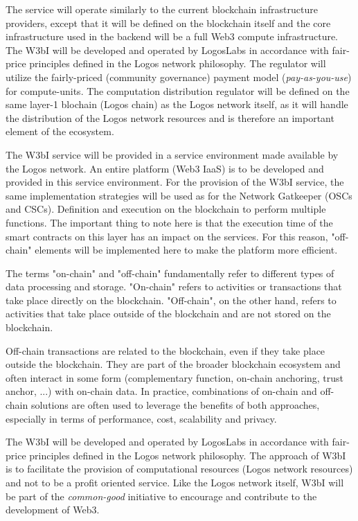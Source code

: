 \documentclass[]{article}
\begin{document}
The service will operate similarly to the current blockchain infrastructure providers, except that it will be defined on the blockchain itself and the core infrastructure used in the backend will be a full Web3 compute infrastructure.
The W3bI will be developed and operated by LogosLabs in accordance with fair-price principles defined in the Logos network philosophy.
The regulator will utilize the fairly-priced (community governance) payment model (\textit{pay-as-you-use}) \cite{WikipediaDoc-payu} for compute-units.
The computation distribution regulator will be defined on the same layer-1 blochain (Logos chain) as the Logos network itself, as it will handle the distribution of the Logos network resources and is therefore an important element of the ecosystem. 

The W3bI service will be provided in a service environment made available by the Logos network.
An entire platform (Web3 IaaS) is to be developed and provided in this service environment.
For the provision of the W3bI service, the same implementation strategies will be used as for the Network Gatkeeper (OSCs and CSCs). 
Definition and execution on the blockchain to perform multiple functions.
The important thing to note here is that the execution time of the smart contracts on this layer has an impact on the services. 
For this reason, "off-chain" elements will be implemented here to make the platform more efficient. 

The terms "on-chain" and "off-chain" fundamentally refer to different types of data processing and storage.
"On-chain" refers to activities or transactions that take place directly on the blockchain.
"Off-chain", on the other hand, refers to activities that take place outside of the blockchain and are not stored on the blockchain.

Off-chain transactions are related to the blockchain, even if they take place outside the blockchain. 
They are part of the broader blockchain ecosystem and often interact in some form (complementary function, on-chain anchoring, trust anchor, ...) with on-chain data.
In practice, combinations of on-chain and off-chain solutions are often used to leverage the benefits of both approaches, especially in terms of performance, cost, scalability and privacy.

The W3bI will be developed and operated by LogosLabs in accordance with fair-price principles defined in the Logos network philosophy.
The approach of W3bI is to facilitate the provision of computational resources (Logos network resources) and not to be a profit oriented service.
Like the Logos network itself, W3bI will be part of the \textit{common-good} initiative to encourage and contribute to the development of Web3.
\end{document}
